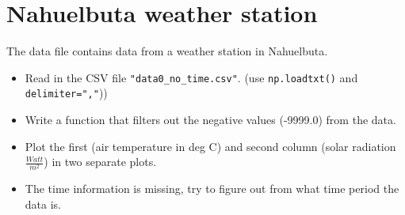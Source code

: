 
\section{Nahuelbuta weather station}

The data file contains data from a weather station in Nahuelbuta.

\begin{itemize}
    \item Read in the CSV file \verb|"data0_no_time.csv"|. (use \verb|np.loadtxt()| and \verb|delimiter=","|))
    \item Write a function that filters out the negative values (-9999.0) from the data.
    \item Plot the first (air temperature in deg C) and second column (solar radiation $\frac{Watt}{m^2}$) in two separate plots.
    \item The time information is missing, try to figure out from what time period the data is.
\end{itemize}
